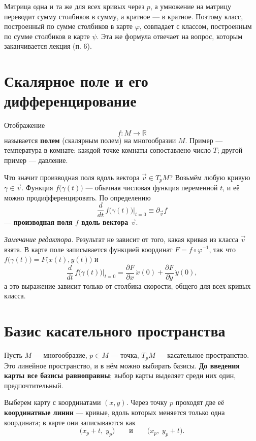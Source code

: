 \documentclass[11pt,a4paper]{article}
\begin{document}
Матрица одна и та же для всех кривых через $p$, а умножение на матрицу переводит сумму столбиков в сумму, а кратное — в кратное. Поэтому класс, построенный по сумме столбиков в карте $\varphi$, совпадает с классом, построенным по сумме столбиков в карте $\psi$. Эта же формула отвечает на вопрос, которым заканчивается лекция (п. 6).

\section{Скалярное поле и его дифференцирование}

Отображение
\[
f\colon M \to \mathbb{R}
\]
называется \textbf{полем} (скалярным полем) на многообразии $M$. Пример — температура в комнате: каждой точке комнаты сопоставлено число $T$; другой пример — давление.

Что значит производная поля вдоль вектора $\vec v \in T_pM$? Возьмём любую кривую $\gamma \in \vec v$. Функция $f\bigl(\gamma(t)\bigr)$ — обычная числовая функция переменной $t$, и её можно продифференцировать. По определению
\[
\boxed{\; \frac{d}{dt}\, f\bigl(\gamma(t)\bigr)\Big|_{t=0} \equiv \partial_{\vec v} f \;}
\]
— \textbf{производная поля $f$ вдоль вектора $\vec v$}.

\emph{Замечание редактора.} Результат не зависит от того, какая кривая из класса $\vec v$ взята. В карте поле записывается функцией координат $F = f \circ \varphi^{-1}$, так что $f\bigl(\gamma(t)\bigr) = F\bigl(x(t), y(t)\bigr)$ и
\[
\frac{d}{dt}\, f\bigl(\gamma(t)\bigr)\Big|_{t=0} = \frac{\partial F}{\partial x}\,\dot x(0) + \frac{\partial F}{\partial y}\,\dot y(0),
\]
а это выражение зависит только от столбика скорости, общего для всех кривых класса.

\section{Базис касательного пространства}

Пусть $M$ — многообразие, $p \in M$ — точка, $T_pM$ — касательное пространство. Это линейное пространство, и в нём можно выбирать базисы. \textbf{До введения карты все базисы равноправны}; выбор карты выделяет среди них один, предпочтительный.

Выберем карту с координатами $(x, y)$. Через точку $p$ проходят две её \textbf{координатные линии} — кривые, вдоль которых меняется только одна координата; в карте они записываются как
\[
\bigl(x_p + t,\; y_p\bigr) \qquad \text{и} \qquad \bigl(x_p,\; y_p + t\bigr).
\]
\end{document}
